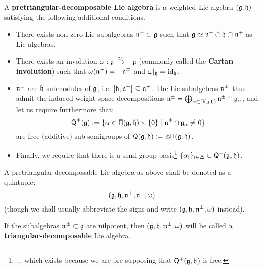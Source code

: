         \begin{definition} \label{def: (pre)triangular_decomposable_lie_algebras}
            A \textbf{pretriangular-decomposable Lie algebra} is a weighted Lie algebra $(\mathfrak{g}, \mathfrak{h})$ satisfying the following additional conditions.
            \begin{itemize}
                \item There exists non-zero Lie subalgebras $\mathfrak{n}^{\pm} \subset \mathfrak{g}$ such that $\mathfrak{g} \simeq \mathfrak{n}^- \oplus \mathfrak{h} \oplus \mathfrak{n}^+$ as Lie algebras.
                \item There exists an involution $\omega: \mathfrak{g} \xrightarrow[]{\simeq} -\mathfrak{g}$ (commonly called the \textbf{Cartan involution}) such that $\omega(\mathfrak{n}^{\pm}) = -\mathfrak{n}^{\mp}$ and $\omega|_{\mathfrak{h}} = \mathrm{id}_{\mathfrak{h}}$.
                \item $\mathfrak{n}^{\pm}$ are $\mathfrak{h}$-submodules of $\mathfrak{g}$, i.e. $[\mathfrak{h}, \mathfrak{n}^{\pm}] \subseteq \mathfrak{n}^{\pm}$. The Lie subalgebras $\mathfrak{n}^{\pm}$ thus admit the induced weight space decompositions $\mathfrak{n}^{\pm} = \bigoplus_{\alpha \in \mathsf{\Pi}(\mathfrak{g}, \mathfrak{h})} \mathfrak{n}^{\pm} \cap \mathfrak{g}_{\alpha}$, and let us require furthermore that:
                    $$\mathsf{Q}^{\pm}(\mathfrak{g}) := \{ \alpha \in \mathsf{\Pi}(\mathfrak{g}, \mathfrak{h}) \smallsetminus \{0\} \mid \mathfrak{n}^{\pm} \cap \mathfrak{g}_{\alpha} \not = 0 \}$$
                are free (additive) sub-semigroups of $\mathsf{Q}(\mathfrak{g}, \mathfrak{h}) := \mathbb{Z}\mathsf{\Pi}(\mathfrak{g}, \mathfrak{h})$.
                \item Finally, we require that there is a semi-group basis\footnote{... which exists because we are pre-supposing that $\mathsf{Q}^+(\mathfrak{g}, \mathfrak{h})$ is free.} $\{\alpha_i\}_{i \in \mathsf{\Delta}} \subset \mathsf{Q}^+(\mathfrak{g}, \mathfrak{h})$.
            \end{itemize}
            A pretriangular-decomposable Lie algebra as above shall be denoted as a quintuple:
                $$(\mathfrak{g}, \mathfrak{h}, \mathfrak{n}^+, \mathfrak{n}^-, \omega)$$
            (though we shall usually abbreviate the signs and write $(\mathfrak{g}, \mathfrak{h}, \mathfrak{n}^{\pm}, \omega)$ instead).

            If the subalgebras $\mathfrak{n}^{\pm} \subset \mathfrak{g}$ are nilpotent, then $(\mathfrak{g}, \mathfrak{h}, \mathfrak{n}^{\pm}, \omega)$ will be called a \textbf{triangular-decomposable} Lie algebra.
        \end{definition}
